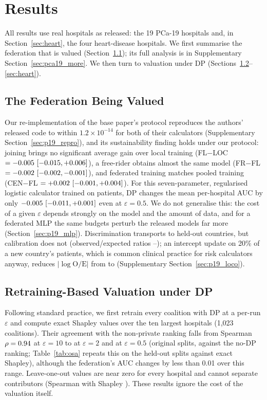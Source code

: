\section{Results}
\label{sec:results}
All results use real hospitals as released: the 19 PCa-19 hospitals and, in Section~\ref{sec:heart}, the four heart-disease hospitals. We first summarise the federation that is valued (Section~\ref{sec:federation}); its full analysis is in Supplementary Section~\ref{sec:pca19_more}. We then turn to valuation under DP (Sections~\ref{sec:p19_retrain}--\ref{sec:heart}).

\subsection{The Federation Being Valued}
\label{sec:federation}
Our re-implementation of the base paper's protocol reproduces the authors' released code to within $1.2\times10^{-14}$ for both of their calculators (Supplementary Section~\ref{sec:p19_repro}), and its sustainability finding holds under our protocol: joining brings no significant average gain over local training (FL$-$LOC $=-0.005\ [-0.015, +0.006]$), a free-rider obtains almost the same model (FR$-$FL $=-0.002\ [-0.002, -0.001]$), and federated training matches pooled training (CEN$-$FL $=+0.002\ [-0.001, +0.004]$). For this seven-parameter, regularised logistic calculator trained on \pNineN{} patients, DP changes the mean per-hospital AUC by only $-0.005\ [-0.011, +0.001]$ even at $\varepsilon=0.5$. We do not generalise this: the cost of a given $\varepsilon$ depends strongly on the model and the amount of data, and for a federated MLP the same budgets perturb the released models far more (Section~\ref{sec:p19_mlp}). Discrimination transports to held-out countries, but calibration does not (observed/expected ratios \pOeMin--\pOeMax); an intercept update on 20\% of a new country's patients, which is common clinical practice for risk calculators anyway, reduces $|\log\mathrm{O/E}|$ from \pRecalOeRaw{} to \pRecalOeInt{} (Supplementary Section~\ref{sec:p19_loco}).

\subsection{Retraining-Based Valuation under DP}
\label{sec:p19_retrain}
Following standard practice, we first retrain every coalition with DP at a per-run $\varepsilon$ and compute exact Shapley values over the ten largest hospitals (1{,}023 coalitions). Their agreement with the non-private ranking falls from Spearman $\rho=0.94$ at $\varepsilon=10$ to \pShRhoTwo{} at $\varepsilon=2$ and \pShRhoHalf{} at $\varepsilon=0.5$ (original splits, against the no-DP ranking; Table~\ref{tab:osa} repeats this on the held-out splits against exact Shapley), although the federation's AUC changes by less than 0.01 over this range. Leave-one-out values are near zero for every hospital and cannot separate contributors (Spearman with Shapley \pShLooRho). These results ignore the cost of the valuation itself.

